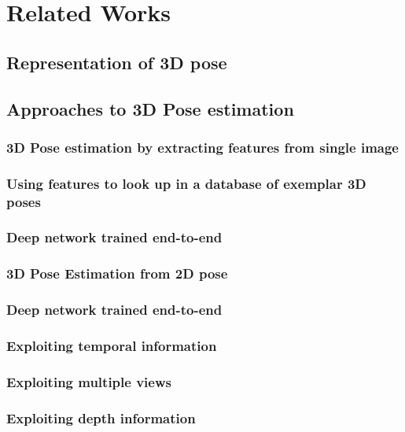 
\chapter{Related Works}\label{chapter:relatedworks}

\section{Representation of 3D pose}

\section{Approaches to 3D Pose estimation}

\subsection{3D Pose estimation by extracting features from single image}
\subsection{Using features to look up in a database of exemplar 3D poses}
\subsection{Deep network trained end-to-end}
\subsection{3D Pose Estimation from 2D pose}
\subsection{Deep network trained end-to-end}
\subsection{Exploiting temporal information}
\subsection{Exploiting multiple views}
\subsection{Exploiting depth information}

